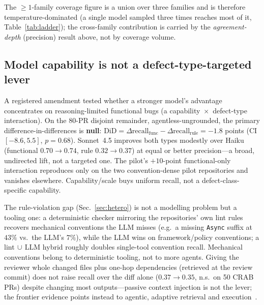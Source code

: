 The ${\geq}1$-family coverage figure is a union over three families and is
therefore temperature-dominated (a single model sampled three times reaches
most of it, Table~\ref{tab:ladder}); the cross-family contribution is carried
by the \emph{agreement-depth} (precision) result above, not by coverage volume.


\subsection{Model capability is not a defect-type-targeted lever}
\label{sec:capability}
A registered amendment tested whether a stronger model's advantage concentrates
on reasoning-limited functional bugs (a capability~$\times$~defect-type
interaction). On the 80-PR disjoint remainder, agentless-ungrounded, the primary
difference-in-differences is \textbf{null}:
$\mathrm{DiD}{=}\Delta\text{recall}_{\text{func}}-\Delta\text{recall}_{\text{rule}}
{=}{-}1.8$ points (CI $[-8.6, 5.5]$, $p{=}0.68$). Sonnet~4.5 improves both types
modestly over Haiku (functional $0.70{\to}0.74$, rule $0.32{\to}0.37$) at equal
or better precision---a broad, undirected lift, not a targeted one. The pilot's
$+10$-point functional-only interaction reproduces only on the two
convention-dense pilot repositories and vanishes elsewhere. Capability/scale
buys uniform recall, not a defect-class-specific capability.


The rule-violation gap (Sec.~\ref{sec:hetero}) is not a modelling problem but a
tooling one: a deterministic checker mirroring the repositories' own lint rules
recovers mechanical conventions the LLM misses (e.g.\ a missing \texttt{Async}
suffix at $43\%$ vs.\ the LLM's $7\%$), while the LLM wins on framework/policy
conventions; a lint$\,\cup\,$LLM hybrid roughly doubles single-tool convention
recall. Mechanical conventions belong to deterministic tooling, not to more
agents.
Giving the reviewer whole changed files plus one-hop dependencies (retrieved at
the review commit) does not raise recall over the diff alone
($0.37{\to}0.35$, n.s.\ on 50 CRAB PRs) despite changing most outputs---passive
context injection is not the lever; the frontier evidence points instead to
agentic, adaptive retrieval and execution~\cite{swereview}.
